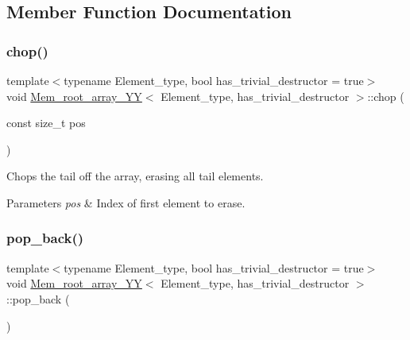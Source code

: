 \subsection{Member Function Documentation}
\mbox{\label{classMem__root__array__YY_ae8180a30bba47eaf409351f33c1b7f1b}} 
\subsubsection{\texorpdfstring{chop()}{chop()}}
{\footnotesize\ttfamily template$<$typename Element\+\_\+type, bool has\+\_\+trivial\+\_\+destructor = true$>$ \\
void \mbox{\hyperlink{classMem__root__array__YY}{Mem\+\_\+root\+\_\+array\+\_\+\+YY}}$<$ Element\+\_\+type, has\+\_\+trivial\+\_\+destructor $>$\+::chop (\begin{DoxyParamCaption}\item[{const size\+\_\+t}]{pos }\end{DoxyParamCaption})\hspace{0.3cm}{\ttfamily [inline]}}

Chops the tail off the array, erasing all tail elements. 
\begin{DoxyParams}{Parameters}
{\em pos} & Index of first element to erase. \\
\hline
\end{DoxyParams}
\mbox{\label{classMem__root__array__YY_aa07dcb7f72b3b2bba7a46985505fed95}} 
\subsubsection{\texorpdfstring{pop\+\_\+back()}{pop\_back()}}
{\footnotesize\ttfamily template$<$typename Element\+\_\+type, bool has\+\_\+trivial\+\_\+destructor = true$>$ \\
void \mbox{\hyperlink{classMem__root__array__YY}{Mem\+\_\+root\+\_\+array\+\_\+\+YY}}$<$ Element\+\_\+type, has\+\_\+trivial\+\_\+destructor $>$\+::pop\+\_\+back (\begin{DoxyParamCaption}{ }\end{DoxyParamCaption})\hspace{0.3cm}{\ttfamily [inline]}}

